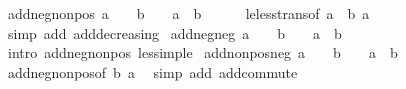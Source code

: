 \begin{isabellebody}
\endisatagproof
{\isafoldproof}%
%
\isadelimproof
\isanewline
%
\endisadelimproof
\isanewline
{}\isamarkupfalse%
\ add{\isacharunderscore}{\kern0pt}neg{\isacharunderscore}{\kern0pt}nonpos{\isacharcolon}{\kern0pt}\ {\isachardoublequoteopen}a\ {\isacharless}{\kern0pt}\ {}\ {\isasymLongrightarrow}\ b\ {\isasymle}\ {}\ {\isasymLongrightarrow}\ a\ {\isacharplus}{\kern0pt}\ b\ {\isacharless}{\kern0pt}\ {}{\isachardoublequoteclose}\isanewline
%
\isadelimproof
\ \ %
\endisadelimproof
%
\isatagproof
{}\isamarkupfalse%
\ le{\isacharunderscore}{\kern0pt}less{\isacharunderscore}{\kern0pt}trans{\isacharbrackleft}{\kern0pt}of\ {\isachardoublequoteopen}a\ {\isacharplus}{\kern0pt}\ b{\isachardoublequoteclose}\ a\ {}{\isacharbrackright}{\kern0pt}\ \isamarkupfalse%
\ {\isacharparenleft}{\kern0pt}simp\ add{\isacharcolon}{\kern0pt}\ add{\isacharunderscore}{\kern0pt}decreasing{}{\isacharparenright}{\kern0pt}%
\endisatagproof
{\isafoldproof}%
%
\isadelimproof
\isanewline
%
\endisadelimproof
\isanewline
{}\isamarkupfalse%
\ add{\isacharunderscore}{\kern0pt}neg{\isacharunderscore}{\kern0pt}neg{\isacharcolon}{\kern0pt}\ {\isachardoublequoteopen}a\ {\isacharless}{\kern0pt}\ {}\ {\isasymLongrightarrow}\ b\ {\isacharless}{\kern0pt}\ {}\ {\isasymLongrightarrow}\ a\ {\isacharplus}{\kern0pt}\ b\ {\isacharless}{\kern0pt}\ {}{\isachardoublequoteclose}\isanewline
%
\isadelimproof
\ \ %
\endisadelimproof
%
\isatagproof
{}\isamarkupfalse%
\ {\isacharparenleft}{\kern0pt}intro\ add{\isacharunderscore}{\kern0pt}neg{\isacharunderscore}{\kern0pt}nonpos\ less{\isacharunderscore}{\kern0pt}imp{\isacharunderscore}{\kern0pt}le{\isacharparenright}{\kern0pt}%
\endisatagproof
{\isafoldproof}%
%
\isadelimproof
\isanewline
%
\endisadelimproof
\isanewline
{}\isamarkupfalse%
\ add{\isacharunderscore}{\kern0pt}nonpos{\isacharunderscore}{\kern0pt}neg{\isacharcolon}{\kern0pt}\ {\isachardoublequoteopen}a\ {\isasymle}\ {}\ {\isasymLongrightarrow}\ b\ {\isacharless}{\kern0pt}\ {}\ {\isasymLongrightarrow}\ a\ {\isacharplus}{\kern0pt}\ b\ {\isacharless}{\kern0pt}\ {}{\isachardoublequoteclose}\isanewline
%
\isadelimproof
\ \ %
\endisadelimproof
%
\isatagproof
{}\isamarkupfalse%
\ add{\isacharunderscore}{\kern0pt}neg{\isacharunderscore}{\kern0pt}nonpos{\isacharbrackleft}{\kern0pt}of\ b\ a{\isacharbrackright}{\kern0pt}\ \isamarkupfalse%
\ {\isacharparenleft}{\kern0pt}simp\ add{\isacharcolon}{\kern0pt}\ add{\isacharunderscore}{\kern0pt}commute{\isacharparenright}{\kern0pt}%

\end{isabellebody}
